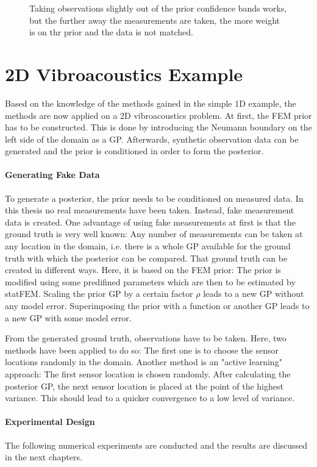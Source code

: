 \documentclass[%
  a4paper,oneside,%
  11pt,%
  smallchapters,
  style=printdev,
  extramargin,
  green,%
  rgb, <cmyk>
  ]{tubsbook}
\begin{document}
\begin{figure}[!ht]
\caption{Taking observations slightly out of the prior confidence bands works, but the further away the measurements are taken, the more weight is on thr prior and the data is not matched.}
\end{figure}
%
\section{2D Vibroacoustics Example}
Based on the knowledge of the methods gained in the simple 1D example, the methods are now applied on a 2D vibroacoustics problem. At first, the FEM prior has to be constructed. This is done by introducing the Neumann boundary on the left side of the domain as a GP. Afterwards, synthetic observation data can be generated and the prior is conditioned in order to form the posterior.

\paragraph{Generating Fake Data}
To generate a posterior, the prior needs to be conditioned on measured data. In this thesis no real measurements have been taken. Instead, fake measurement data is created. One advantage of using fake measurements at first is that the ground truth is very well known: Any number of measurements can be taken at any location in the domain, i.e. there is a whole GP available for the ground truth with which the posterior can be compared.
That ground truth can be created in different ways. Here, it is based on the FEM prior: The prior is modified using some predifined parameters which are then to be estimated by statFEM. Scaling the prior GP by a certain factor $\rho$ leads to a new GP without any model error. Superimposing the prior with a function or another GP leads to a new GP with some model error.

From the generated ground truth, observations have to be taken. Here, two methods have been applied to do so: The first one is to choose the sensor locations randomly in the domain. Another method is an "active learning" approach: The first sensor location is chosen randomly. After calculating the posterior GP, the next sensor location is placed at the point of the highest variance. This should lead to a quicker convergence to a low level of variance.


\paragraph{Experimental Design}
The following numerical experiments are conducted and the results are discussed in the next chapters.
\end{document}
